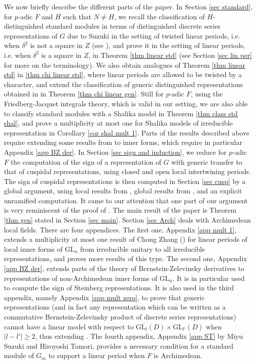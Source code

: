 \documentclass[11pt,letterpaper]{amsart}
\newcommand{\GL}{{\mathrm {GL}}} \newcommand{\PGL}{{\mathrm {PGL}}}
\def\d{\delta}
\theoremstyle{plain}
\numberwithin{equation}{section}
\begin{document}
We now briefly describe the different parts of the paper. In Section \ref{sec standard}, for $p$-adic $F$ and $H$ such that $N\neq H$, we recall the classification of $H$-distinguished standard modules in terms of distinguished discrete series representations of $G$ due to Suzuki in the setting of twisted linear periods, i.e. when $\d^2$ is not a square in $Z$ (see \cite{SuzJNT}), and prove it in the setting of linear periods, i.e. when $\d^2$ is a square in $Z$, in Theorem \ref{thm linear std} (see Section \ref{sec lin per} for more on the terminology). We also obtain analogues of Theorem \ref{thm linear std} in \ref{thm chi linear std}, where linear periods are allowed to be twisted by a character, and extend the classification of generic distinguished representations obtained in \cite{MatCRELLE} in Theorem \ref{thm chi linear gen}. Still for $p$-adic $F$, using the Friedberg-Jacquet integrals theory, which is valid in our setting, we are also able to classify standard modules with a Shalika model in Theorem \ref{thm class std shal}, and prove a multiplicity at most one for Shalika models of irreducible representation in Corollary \ref{cor shal mult 1}. Parts of the results described above require extending some results from \cite{MatJNT} to inner forms, which require in particular Appendix \ref{app BZ der}. In Section \ref{sec sign and induction}, we reduce for $p$-adic $F$ the computation of the sign of a representation of $G$ with generic transfer to that of cuspidal representations, using closed and open local intertwining periods. The sign of cuspidal representations is then computed in Section \ref{sec cusp} by a global argument, using local results from \cite{FJ}, global results from \cite{XZ}, and an explicit unramified computation. It came to our attention that one part of our argument is very reminiscent of the proof of \cite[Theorem A]{Pra-Ram}. The main result of the paper is Theorem \ref{thm gen} stated in Section \ref{sec main}. Section \ref{sec Arch} deals with Archimedean local fields. 
There are four appendices. The first one, Appendix \ref{app mult 1}, extends a multiplicity at most one result of Chong Zhang (\cite{Zlinear}) for linear periods of local inner forms of $\GL_n$ from irreducible unitary to all irreducible representations, and proves more results of this type. The second one, Appendix \ref{app BZ der}, extends parts of the theory of Bernstein-Zelevinsky derivatives to representations of non-Archimedean inner forms of $\GL_n$. It is in particular used to compute the sign of Steinberg representations. It is also used in the third appendix, namely Appendix \ref{app mult zero}, to prove that generic representations (and in fact any representation which can be written as a commutative Bernstein-Zelevinsky product of discrete series representations) cannot have a linear model with respect to 
$\GL_l(D)\times \GL_{l'}(D)$ when $|l-l'|\geq 2$, thus extending \cite[Theorem 3.2]{MatJNT}. The fourth appendix, Appendix \ref{app ST} by Miyu Suzuki and Hiroyoshi Tamori, provides a necessary condition for a standard module of $G_m$ to support a linear period when $F$ is Archimedean.\\
\end{document}

